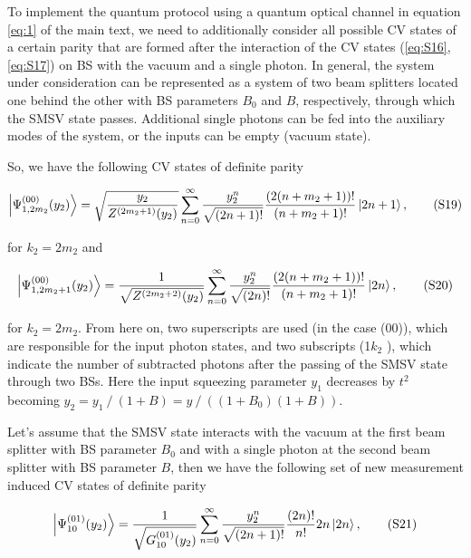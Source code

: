 \documentclass{optica-article}
\begin{document}
\par To implement the quantum protocol using a quantum optical channel in equation \eqref{eq:1}  of the main text, we need to additionally consider all possible CV states of a certain parity that are formed after the interaction of the CV states (\ref{eq:S16},\,\ref{eq:S17}) on BS with the vacuum and a single photon. In general, the system under consideration can be represented as a system of two beam splitters located one behind the other with BS parameters $B_0$ and $B$, respectively, through which the SMSV state passes. Additional single photons can be fed into the auxiliary modes of the system, or the inputs can be empty (vacuum state).
\par So, we have the following CV states of definite parity



\begin{equation}\label{eq:S19}
    \ket{\Psi_{1,2m_2}^{(00)}(y_2)} =
    \sqrt{\frac{y_2}{{Z^{(2m_2+1)}}(y_2)}}\sum_{n=0}^{\infty} \frac{y_2^{n}}{\sqrt{(2n+1)!}}\frac{(2(n+m_2+1))!}{(n+m_2+1)!}\ket{2n+1},  
\tag{S19}
\end{equation}


\!\!\!\!\!\!for $k_2=2m_2$ and 


\begin{equation}\label{eq:20}
    \ket{\Psi_{1,2m_2+1}^{(00)}(y_2)} =
    \frac{1}{\sqrt{Z^{(2m_2+2)}(y_2)}}\sum_{n=0}^{\infty} \frac{y_2^{n}}{\sqrt{(2n)!}}\frac{(2(n+m_2+1))!}{(n+m_2+1)!}\ket{2n},  
\tag{S20}
\end{equation}

\!\!\!\!\!\!for $k_2=2m_2$. From here on, two superscripts are used (in the case (00)), which are responsible for the input photon states, and two subscripts (1$k_2$ ), which indicate the number of subtracted photons after the passing of the SMSV state through two BSs. Here the input squeezing parameter $y_1$ decreases by $t^2$ becoming $y_2=y_1⁄(1+B)=y⁄((1+B_0 )(1+B))$.  
\par Let's assume that the SMSV state interacts with the vacuum at the first beam splitter with BS parameter $B_0$ and with a single photon at the second beam splitter with BS parameter $B$, then we have the following set of new measurement induced CV states of definite parity


\begin{equation}\label{eq:S21}
    \ket{\Psi_{10}^{(01)}(y_2)} =
    \frac{1}{\sqrt{G_{10}^{(01)}(y_2)}}\sum_{n=0}^{\infty} \frac{y_2^{n}}{\sqrt{(2n+1)!}}\frac{(2n)!}{n!}2n\ket{2n},  
\tag{S21}
\end{equation}
\end{document}

